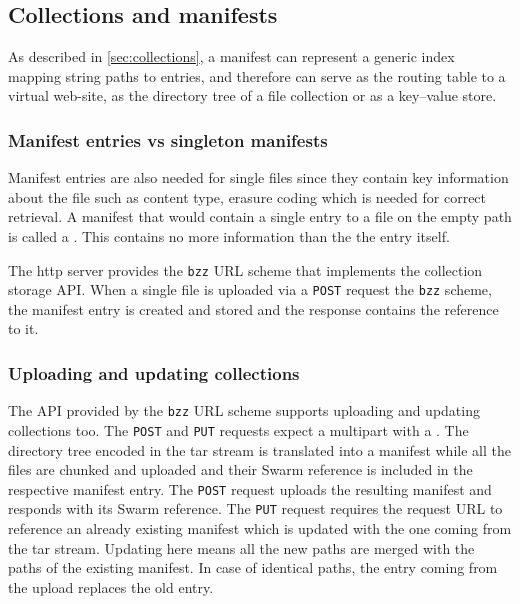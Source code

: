 \subsection{Collections and manifests \statusgreen}\label{sec:manifests-ux}

As described in \ref{sec:collections}, a manifest can represent a generic index mapping string paths to entries, and therefore can serve as the routing table to a virtual web-site, as the directory tree of a file collection or as a key--value store. 

\subsubsection{Manifest entries vs singleton manifests}

Manifest entries are also needed for single files since they contain key information about the file such as content type, erasure coding which is needed for correct retrieval. A manifest that would contain a single entry to a file on  the empty path is called a . This contains no more information than the the entry itself.  

The http server provides the \lstinline{bzz} URL scheme that implements the collection storage API. When a single file is uploaded via a \lstinline{POST} request the \lstinline{bzz} scheme, the manifest entry is created and stored and the response contains the reference to it.

\subsubsection{Uploading and updating collections}

The API provided by the \lstinline{bzz} URL scheme supports uploading and updating collections too. The \lstinline{POST} and \lstinline{PUT} requests expect a multipart with a . The directory tree encoded in the tar stream is translated into a manifest while all the files are chunked and uploaded and their Swarm reference is included in the respective manifest entry. The \lstinline{POST} request uploads the resulting manifest and responds with its Swarm reference. The \lstinline{PUT} request requires the request URL to reference an already existing manifest which is updated with the one coming from the tar stream. Updating here means all the new paths are merged with the paths of the existing manifest. In case of identical paths, the entry coming from the upload replaces the old entry.

